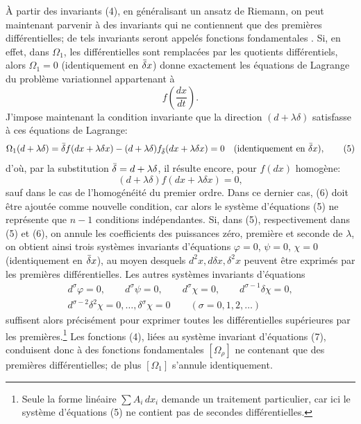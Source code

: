 À partir des invariants (4), en généralisant un ansatz de Riemann, on peut
maintenant parvenir à des invariants qui ne contiennent que des premières
différentielles; de tels invariants seront appelés \og{} fonctions fondamentales \fg{}.
Si, en effet, dans \(\Omega_1\), les différentielles sont remplacées par les
quotients différentiels, alors \(\Omega_1=0\) (identiquement en \(\bar{\delta} x\))
donne exactement les équations de Lagrange du problème variationnel
appartenant à
\[
f\!\left(\frac{dx}{dt}\right).
\]
J'impose maintenant la condition invariante que la direction
\((d+\lambda\delta)\) satisfasse à ces équations de Lagrange:
\begin{equation}
\Omega_1(d+\lambda\delta)=
\bar{\delta} f(dx+\lambda\delta x)
-(d+\lambda\delta)f_{\bar{\delta}}(dx+\lambda\delta x)=0
\quad(\text{identiquement en }\bar{\delta} x),
\tag{5}
\end{equation}
d'où, par la substitution \(\bar{\delta}=d+\lambda\delta\), il résulte encore,
pour \(f(dx)\) homogène:
\begin{equation}
(d+\lambda\delta)f(dx+\lambda\delta x)=0,
\tag{6}
\end{equation}
sauf dans le cas de l'homogénéité du premier ordre. Dans ce dernier cas,
(6) doit être ajoutée comme nouvelle condition, car alors le système
d'équations (5) ne représente que \(n-1\) conditions indépendantes. Si,
dans (5), respectivement dans (5) et (6), on annule les coefficients des
puissances zéro, première et seconde de \(\lambda\), on obtient ainsi
trois systèmes invariants d'équations
\(\varphi=0\), \(\psi=0\), \(\chi=0\) (identiquement en \(\bar{\delta} x\)),
au moyen desquels \(d^2x,d\delta x,\delta^2x\) peuvent être exprimés par les
premières différentielles. Les autres systèmes invariants d'équations
\begin{equation}
\begin{gathered}
d^\sigma\varphi=0,\qquad d^\sigma\psi=0,\qquad
d^\sigma\chi=0,\qquad d^{\sigma-1}\delta\chi=0,\\
d^{\sigma-2}\delta^2\chi=0,\ldots,\delta^\sigma\chi=0
\qquad(\sigma=0,1,2,\ldots)
\end{gathered}
\tag{7}
\end{equation}
suffisent alors précisément pour exprimer toutes les différentielles
supérieures par les premières.\footnote{Seule la forme linéaire
\(\sum A_i\,dx_i\) demande un traitement particulier, car ici le système
d'équations (5) ne contient pas de secondes différentielles.} Les fonctions
(4), liées au système invariant d'équations (7), conduisent donc à des
fonctions fondamentales \([\Omega_\rho]\) ne contenant que des premières
différentielles; de plus \([\Omega_1]\) s'annule identiquement.

